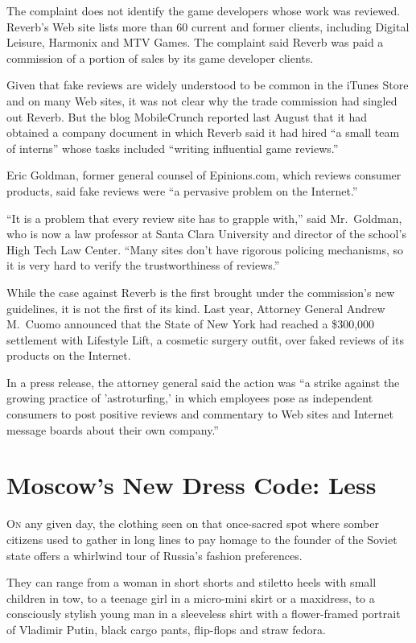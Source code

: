 ﻿\documentclass[12pt]{article}
\begin{document}
The complaint does not identify the game developers whose work was reviewed. Reverb's Web site lists
more than 60 current and former clients, including Digital Leisure, Harmonix and MTV Games. The
complaint said Reverb was paid a commission of a portion of sales by its game developer clients.

Given that fake reviews are widely understood to be common in the iTunes Store and on many Web
sites, it was not clear why the trade commission had singled out Reverb. But the blog MobileCrunch
reported last August that it had obtained a company document in which Reverb said it had hired ``a
small team of interns'' whose tasks included ``writing influential game reviews.''

Eric Goldman, former general counsel of Epinions.com, which reviews consumer products, said fake
reviews were ``a pervasive problem on the Internet.''

``It is a problem that every review site has to grapple with,'' said Mr.~Goldman, who is now a law
professor at Santa Clara University and director of the school's High Tech Law Center. ``Many sites
don't have rigorous policing mechanisms, so it is very hard to verify the trustworthiness of
reviews.''

While the case against Reverb is the first brought under the commission's new guidelines, it is not
the first of its kind. Last year, Attorney General Andrew M.~Cuomo announced that the State of New
York had reached a \$300,000 settlement with Lifestyle Lift, a cosmetic surgery outfit, over faked
reviews of its products on the Internet.

In a press release, the attorney general said the action was ``a strike against the growing practice
of 'astroturfing,' in which employees pose as independent consumers to post positive reviews and
commentary to Web sites and Internet message boards about their own company.''

\pagebreak
\section{Moscow's New Dress Code: Less}

\lettrine{O}{n} any given day, the clothing seen on that once-sacred spot
where somber citizens used to gather in long lines to pay homage to the founder of the Soviet state
offers a whirlwind tour of Russia's fashion preferences.

They can range from a woman in short shorts and stiletto heels with small children in tow, to a
teenage girl in a micro-mini skirt or a maxidress, to a consciously stylish young man in a
sleeveless shirt with a flower-framed portrait of Vladimir Putin, black cargo pants, flip-flops and
straw fedora.
\end{document}
